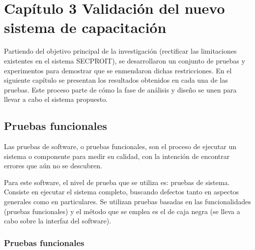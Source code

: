 \chapter*{Capítulo 3 \vspace{0.5cm} \break Validación del nuevo sistema de capacitación}
\setcounter{chapter}{3}
\setcounter{section}{0}

Partiendo del objetivo principal de la investigación (rectificar las limitaciones existentes en el sistema SECPROIT), se desarrollaron un conjunto de pruebas y experimentos para demostrar que se enmendaron dichas restricciones. En el siguiente capítulo se presentan los resultados obtenidos en cada una de las pruebas. Este proceso parte de cómo la fase de análisis y diseño se unen para llevar a cabo el sistema propuesto.

\section{Pruebas funcionales}
 Las pruebas de software, o pruebas funcionales, son el proceso de ejecutar un sistema o componente para medir su calidad, con la intención de encontrar errores que aún no se descubren. %

Para este software, el nivel de prueba que se utiliza es: pruebas de sistema. Consiste en ejecutar el sistema completo, buscando defectos tanto en aspectos generales como en particulares. Se utilizan pruebas basadas en las funcionalidades (pruebas funcionales) y el método que se emplea es el de caja negra (se lleva a cabo sobre la interfaz del software). %

\subsection{Pruebas funcionales}
